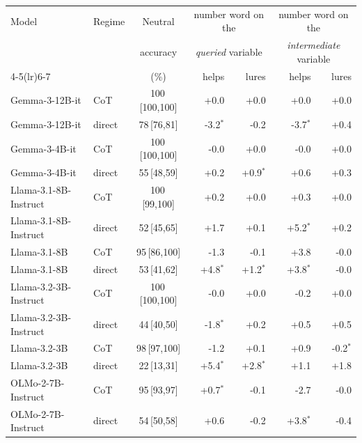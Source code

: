 \begin{tabular}{llcrrrr}
\toprule
Model & Regime & Neutral & \multicolumn{2}{c}{number word on the} & \multicolumn{2}{c}{number word on the} \\
& & accuracy & \multicolumn{2}{c}{\emph{queried} variable} & \multicolumn{2}{c}{\emph{intermediate} variable} \\
\cmidrule(lr){4-5}\cmidrule(lr){6-7}
& & (\%) & helps & lures & helps & lures \\
\midrule
Gemma-3-12B-it & CoT & 100\,{\scriptsize[100,100]} & +0.0 & +0.0 & +0.0 & +0.0 \\
Gemma-3-12B-it & direct & 78\,{\scriptsize[76,81]} & -3.2$^{*}$ & -0.2 & -3.7$^{*}$ & +0.4 \\
\addlinespace
Gemma-3-4B-it & CoT & 100\,{\scriptsize[100,100]} & -0.0 & +0.0 & -0.0 & +0.0 \\
Gemma-3-4B-it & direct & 55\,{\scriptsize[48,59]} & +0.2 & +0.9$^{*}$ & +0.6 & +0.3 \\
\addlinespace
Llama-3.1-8B-Instruct & CoT & 100\,{\scriptsize[99,100]} & +0.2 & +0.0 & +0.3 & +0.0 \\
Llama-3.1-8B-Instruct & direct & 52\,{\scriptsize[45,65]} & +1.7 & +0.1 & +5.2$^{*}$ & +0.2 \\
\addlinespace
Llama-3.1-8B & CoT & 95\,{\scriptsize[86,100]} & -1.3 & -0.1 & +3.8 & -0.0 \\
Llama-3.1-8B & direct & 53\,{\scriptsize[41,62]} & +4.8$^{*}$ & +1.2$^{*}$ & +3.8$^{*}$ & -0.0 \\
\addlinespace
Llama-3.2-3B-Instruct & CoT & 100\,{\scriptsize[100,100]} & -0.0 & +0.0 & -0.2 & +0.0 \\
Llama-3.2-3B-Instruct & direct & 44\,{\scriptsize[40,50]} & -1.8$^{*}$ & +0.2 & +0.5 & +0.5 \\
\addlinespace
Llama-3.2-3B & CoT & 98\,{\scriptsize[97,100]} & -1.2 & +0.1 & +0.9 & -0.2$^{*}$ \\
Llama-3.2-3B & direct & 22\,{\scriptsize[13,31]} & +5.4$^{*}$ & +2.8$^{*}$ & +1.1 & +1.8 \\
\addlinespace
OLMo-2-7B-Instruct & CoT & 95\,{\scriptsize[93,97]} & +0.7$^{*}$ & -0.1 & -2.7 & -0.0 \\
OLMo-2-7B-Instruct & direct & 54\,{\scriptsize[50,58]} & +0.6 & -0.2 & +3.8$^{*}$ & -0.4 \\
\bottomrule
\end{tabular}
